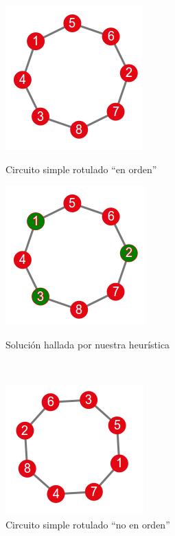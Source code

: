 \begin{figure}[!htb]
\begin{center}
  \includegraphics[scale=0.8]{imagenes/faimilia2.png}
\end{center}
  \caption{Circuito simple rotulado ``en orden''}\label{fig:familia2}
\endminipage\hfill
{}
\begin{center}
  \includegraphics[scale=0.8]{imagenes/faimilia2-resopt.png}
\end{center}
  \caption{Solución hallada por nuestra heurística}\label{fig:familia2res}
\endminipage\\
\begin{center}
  \includegraphics[scale=1.0]{imagenes/faimilia2rename.png}
\end{center}
  \caption{Circuito simple rotulado ``no en orden''}\label{fig:familia2bis}
\endminipage\hfill
{}
\begin{center}

\end{center}
\end{figure}
